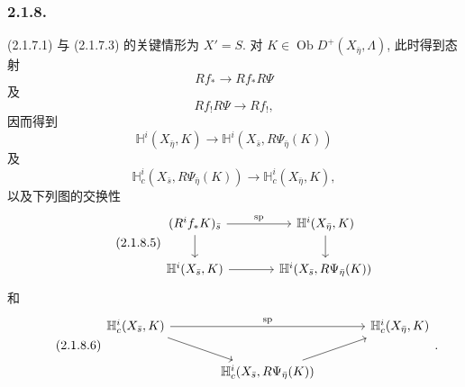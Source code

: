 \subsubsection*{2.1.8.}
(2.1.7.1) 与 (2.1.7.3) 的关键情形为 $X'=S$. 对 $K\in\operatorname{Ob}D^+(X_{\bar\eta},\Lambda)$, 此时得到态射
\begin{equation}\tag{2.1.8.1}
Rf_*\longrightarrow Rf_*R\Psi
\end{equation}
及
\begin{equation}\tag{2.1.8.2}
Rf_!R\Psi\longrightarrow Rf_!,
\end{equation}
因而得到
\begin{equation}\tag{2.1.8.3}
\mathbb H^i(X_{\bar\eta},K)
\longrightarrow
\mathbb H^i(X_{\bar s},R\Psi_{\bar\eta}(K))
\end{equation}
及
\begin{equation}\tag{2.1.8.4}
\mathbb H_c^i(X_{\bar s},R\Psi_{\bar\eta}(K))
\longrightarrow
\mathbb H_c^i(X_{\bar\eta},K),
\end{equation}
以及下列图的交换性
\begin{equation}\tag{2.1.8.5}
\begin{tikzcd}[column sep=large]
(R^if_*K)_{\bar s} \arrow[r, "\mathrm{sp}"] \arrow[d]
  & \mathbb H^i(X_{\bar\eta},K) \arrow[d] \\
\mathbb H^i(X_{\bar s},K) \arrow[r]
  & \mathbb H^i(X_{\bar s},R\Psi_{\bar\eta}(K))
\end{tikzcd}
\end{equation}
和
\begin{equation}\tag{2.1.8.6}
\begin{tikzcd}[column sep=large]
\mathbb H_c^i(X_{\bar s},K) \arrow[rr, "\mathrm{sp}"] \arrow[dr]
  & {} & \mathbb H_c^i(X_{\bar\eta},K) \\
{} & \mathbb H_c^i(X_{\bar s},R\Psi_{\bar\eta}(K)) \arrow[ur] & {}
\end{tikzcd}
.\end{equation}

